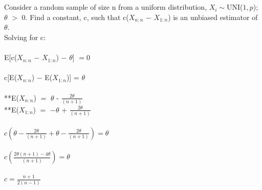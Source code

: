 
 \\
\\
\noindent Consider a random sample of size n from a uniform distribution, $X_i\sim$UNI($1,p$); $\theta$ $>$ $0$.
Find a constant, c, such that c($X_{n:n}$ $-$ $X_{1:n}$) is an unbiased estimator of $\theta$.\\

\noindent Solving for c:\\
\\
\noindent E[c($X_{n:n}$ $-$ $X_{1:n}$) $-$ $\theta$] $= 0$\\
\\
c[E($X_{n:n}$) $-$ E($X_{1:n}$)] = $\theta$
\\
\\ **E($X_{n:n}$) $=$ $\theta$ - $\frac{2\theta}{(n+1)}$
\\ **E($X_{1:n}$) $=$ $-$$\theta$ + $\frac{2\theta}{(n+1)}$
\\
\\$c(\theta - \frac{2\theta}{(n+1)} + \theta - \frac{2\theta}{(n+1)}) = \theta$\\
\\
$c(\frac{2\theta(n+1) - 4\theta}{(n+1)}) = \theta$\\
\\
$c = \frac{n+1}{2(n-1)}$\\





















